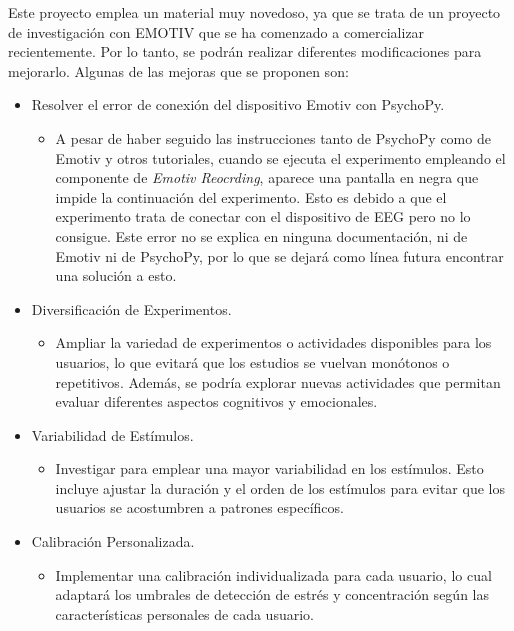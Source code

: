 
Este proyecto emplea un material muy novedoso, ya que se trata de un proyecto de investigación con EMOTIV que se ha comenzado a comercializar recientemente. Por lo tanto, se podrán realizar diferentes modificaciones para mejorarlo. Algunas de las mejoras que se proponen son:

\begin{itemize}
    \item Resolver el error de conexión del dispositivo Emotiv con PsychoPy.
    \begin{itemize}
        \item A pesar de haber seguido las instrucciones tanto de PsychoPy como de Emotiv y otros tutoriales, cuando se ejecuta el experimento empleando el componente de \textit{Emotiv Reocrding}, aparece una pantalla en negra que impide la continuación del experimento. Esto es debido a que el experimento trata de conectar con el dispositivo de EEG pero no lo consigue. Este error no se explica en ninguna documentación, ni de Emotiv ni de PsychoPy, por lo que se dejará como línea futura encontrar una solución a esto.
    \end{itemize}
    \item Diversificación de Experimentos.
    \begin{itemize}
        \item Ampliar la variedad de experimentos o actividades disponibles para los usuarios, lo que evitará que los estudios se vuelvan monótonos o repetitivos. Además, se podría explorar nuevas actividades que permitan evaluar diferentes aspectos cognitivos y emocionales.
    \end{itemize}
    \item Variabilidad de Estímulos.
    \begin{itemize}
        \item Investigar para emplear una mayor variabilidad en los estímulos. Esto incluye ajustar la duración y el orden de los estímulos para evitar que los usuarios se acostumbren a patrones específicos. 
    \end{itemize}
    \item Calibración Personalizada.
    \begin{itemize}
        \item Implementar una calibración individualizada para cada usuario, lo cual adaptará los umbrales de detección de estrés y concentración según las características personales de cada usuario.
    \end{itemize}

\end{itemize}
